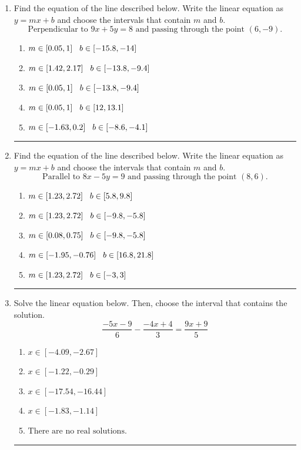 \documentclass[14pt]{extbook}
\newcommand{\litem}[1]{\item#1\hspace*{-1cm}\rule{\textwidth}{0.4pt}}
\begin{document}
\begin{enumerate}
{\begin{enumerate}[label=\Alph*.]
\end{enumerate} }
\litem{
Find the equation of the line described below. Write the linear equation as $ y=mx+b $ and choose the intervals that contain $m$ and $b$.\[ \text{Perpendicular to } 9 x + 5 y = 8 \text{ and passing through the point } (6, -9). \]\begin{enumerate}[label=\Alph*.]
\item \( m \in [0.05, 1] \hspace*{3mm} b \in [-15.8, -14] \)
\item \( m \in [1.42, 2.17] \hspace*{3mm} b \in [-13.8, -9.4] \)
\item \( m \in [0.05, 1] \hspace*{3mm} b \in [-13.8, -9.4] \)
\item \( m \in [0.05, 1] \hspace*{3mm} b \in [12, 13.1] \)
\item \( m \in [-1.63, 0.2] \hspace*{3mm} b \in [-8.6, -4.1] \)

\end{enumerate} }
\litem{
Find the equation of the line described below. Write the linear equation as $ y=mx+b $ and choose the intervals that contain $m$ and $b$.\[ \text{Parallel to } 8 x - 5 y = 9 \text{ and passing through the point } (8, 6). \]\begin{enumerate}[label=\Alph*.]
\item \( m \in [1.23, 2.72] \hspace*{3mm} b \in [5.8, 9.8] \)
\item \( m \in [1.23, 2.72] \hspace*{3mm} b \in [-9.8, -5.8] \)
\item \( m \in [0.08, 0.75] \hspace*{3mm} b \in [-9.8, -5.8] \)
\item \( m \in [-1.95, -0.76] \hspace*{3mm} b \in [16.8, 21.8] \)
\item \( m \in [1.23, 2.72] \hspace*{3mm} b \in [-3, 3] \)

\end{enumerate} }
\litem{
Solve the linear equation below. Then, choose the interval that contains the solution.\[ \frac{-5x -9}{6} - \frac{-4x + 4}{3} = \frac{9x + 9}{5} \]\begin{enumerate}[label=\Alph*.]
\item \( x \in [-4.09, -2.67] \)
\item \( x \in [-1.22, -0.29] \)
\item \( x \in [-17.54, -16.44] \)
\item \( x \in [-1.83, -1.14] \)
\item \( \text{There are no real solutions.} \)


\end{enumerate}}
\end{enumerate}
\end{document}
